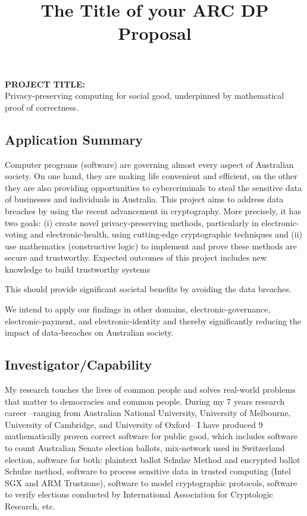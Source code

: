 \documentclass[12pt,a4paper]{article}
\date{}
\title{The Title of your ARC DP Proposal}
\date{} %
\begin{document}
\rmfamily
\date{}


\noindent \textbf{PROJECT TITLE: }\\ \noindent Privacy-preserving computing for 
social good, underpinned by mathematical proof of correctness.





\subsection*{Application Summary}
Computer programs (software) are governing almost every aspect of Australian society. 
On one hand, they are making life convenient and efficient, on the other they 
are also providing opportunities to cybercriminals to steal the sensitive data of 
businesses and individuals in Australia. This project aims to address 
data breaches by using the recent advancement in cryptography. More precisely, 
it has two goals: (i) create novel privacy-preserving methods, particularly
in electronic-voting and electronic-health, using cutting-edge cryptographic techniques 
and (ii) use mathematics (constructive logic) to implement and prove these methods 
are secure and trustworthy. Expected outcomes of this project includes new knowledge 
to build trustworthy systems 

This should provide significant societal benefits by avoiding the data breaches. 




We intend to apply our findings 
in other domains, electronic-governance, electronic-payment, and electronic-identity  
and thereby significantly reducing the impact of data-breaches on Australian society. 



\subsection*{Investigator/Capability}
My research touches the lives of common people and solves
real-world problems that matter to democracies and common people. During my 7 years research career 
--ranging from Australian National University, University of Melbourne, University of Cambridge, 
and University of Oxford-- I have produced 9 mathematically proven correct 
software for public good, which includes software to count Australian Senate election ballots,
mix-network used in Switzerland election, software for both: plaintext ballot Schulze Method and 
encrypted ballot Schulze method, software to process sensitive data in trusted 
computing (Intel SGX and ARM Trustzone), software to model cryptographic protocols, 
software to verify elections conducted by International Association for Cryptologic Research, etc. 
\end{document}
